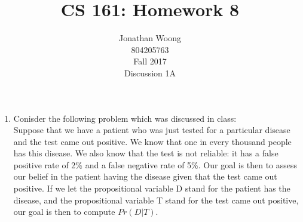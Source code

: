 \documentclass[10.5pt,letterpaper]{article}
\date{\displaydate{date}}
\begin{document}
\title{CS 161: Homework 8}
\author{
	Jonathan Woong\\
	804205763\\
	Fall 2017\\
	Discussion 1A}
\maketitle
\pagebreak


\begin{enumerate}[label=\textbf{Problem \arabic*.}]
\item Conisder the following problem which was discussed in class: \\
Suppose that we have a patient who was just tested for a particular disease and the test came out positive. We know that one in every thousand people has this disease. We also know that the test is not reliable: it has a false positive rate of 2\% and a false negative rate of 5\%. Our goal is then to assess our belief in the patient having the disease given that the test came out positive. If we let the propositional variable D stand for the patient has the disease, and the propositional variable T stand for the test came out positive, our goal is then to compute $Pr(D|T)$.
\end{enumerate}
\end{document}
